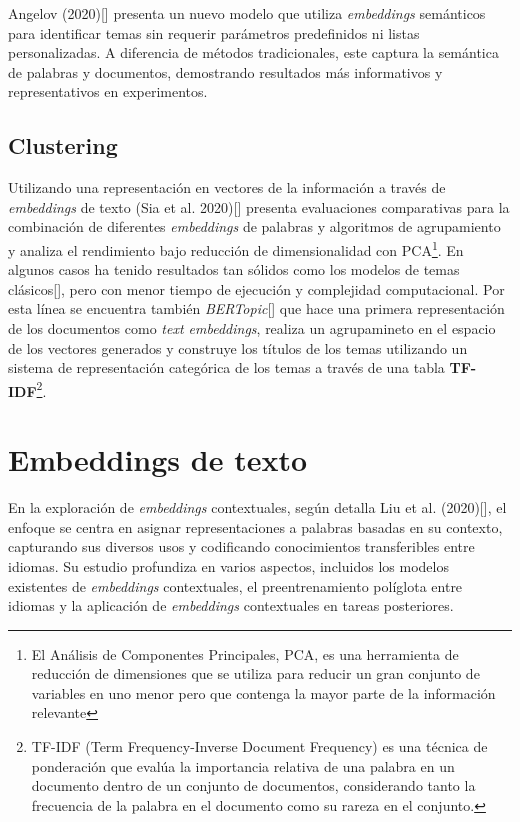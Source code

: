     Angelov (2020)[\cite{angelov2020top2vec}] presenta un nuevo modelo que utiliza \emph{embeddings} semánticos para identificar temas sin requerir parámetros predefinidos ni listas personalizadas. A diferencia de métodos tradicionales, este captura la semántica de palabras y documentos, demostrando resultados más informativos y representativos en experimentos.

    \subsection{Clustering}
    Utilizando una representación en vectores de la información a través de \emph{embeddings} de texto (Sia et al. 2020)[\cite{sia2020tired}] presenta evaluaciones comparativas para la combinación de diferentes \emph{embeddings} de palabras y algoritmos de agrupamiento y analiza el rendimiento bajo reducción de dimensionalidad con PCA\footnote{El Análisis de Componentes Principales, PCA, es una herramienta de reducción de dimensiones que se utiliza para reducir un gran conjunto de variables en uno menor pero que contenga la mayor parte de la información relevante}. En algunos casos ha tenido resultados tan sólidos como los modelos de temas clásicos[\cite{sia2020tiredResults}], pero con menor tiempo de ejecución y complejidad computacional. 
    Por esta línea se encuentra también \emph{BERTopic}[\cite{bertopic}] que hace una primera representación de los documentos como \emph{text embeddings}, realiza un agrupamineto en el espacio de los vectores generados y construye los títulos de los temas utilizando un sistema de representación categórica de los temas a través de una tabla \textbf{TF-IDF}\footnote{TF-IDF (Term Frequency-Inverse Document Frequency) es una técnica de ponderación que evalúa la importancia relativa de una palabra en un documento dentro de un conjunto de documentos, considerando tanto la frecuencia de la palabra en el documento como su rareza en el conjunto.}.

\section{Embeddings de texto}
    En la exploración de \emph{embeddings} contextuales, según detalla Liu et al. (2020)[\cite{liu2020survey}], el enfoque se centra en asignar representaciones a palabras basadas en su contexto, capturando sus diversos usos y codificando conocimientos transferibles entre idiomas. Su estudio profundiza en varios aspectos, incluidos los modelos existentes de \emph{embeddings} contextuales, el preentrenamiento políglota entre idiomas y la aplicación de \emph{embeddings} contextuales en tareas posteriores.


